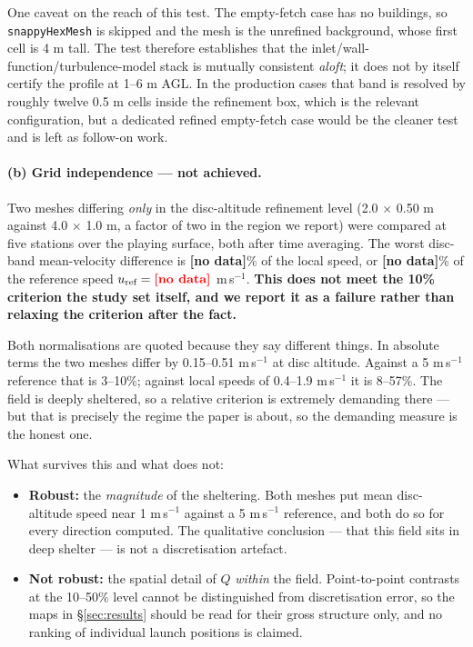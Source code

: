 \documentclass[11pt,letterpaper]{article}
\newcommand{\MISSINGNUM}{\textbf{\color{red}[no data]}}%
\newcommand{\GridDiff}{\MISSINGNUM}\newcommand{\GridDiffUref}{\MISSINGNUM}%
\begin{document}
One caveat on the reach of this test. The empty-fetch case has no buildings, so
\texttt{snappyHexMesh} is skipped and the mesh is the unrefined background,
whose first cell is 4 m tall. The test therefore establishes that the
inlet/wall-function/turbulence-model stack is mutually consistent \emph{aloft};
it does not by itself certify the profile at 1--6 m AGL. In the production cases
that band is resolved by roughly twelve 0.5 m cells inside the refinement box,
which is the relevant configuration, but a dedicated refined empty-fetch case
would be the cleaner test and is left as follow-on work.

\paragraph{(b) Grid independence --- \textbf{not achieved}.} Two meshes
differing \emph{only} in the disc-altitude refinement level (2.0 $\times$ 0.50 m
against 4.0 $\times$ 1.0 m, a factor of two in the region we report) were
compared at five stations over the playing surface, both after time averaging.
The worst disc-band mean-velocity difference is \GridDiff\% of the local
speed, or \GridDiffUref\% of the reference speed
$u_{\text{ref}} = \Uref$ m\,s$^{-1}$. \textbf{This does not meet the 10\%
criterion the study set itself, and we report it as a failure rather than
relaxing the criterion after the fact.}

Both normalisations are quoted because they say different things. In absolute
terms the two meshes differ by 0.15--0.51 m\,s$^{-1}$ at disc altitude. Against
a 5 m\,s$^{-1}$ reference that is 3--10\%; against local speeds of
0.4--1.9 m\,s$^{-1}$ it is 8--57\%. The field is deeply sheltered, so a
relative criterion is extremely demanding there --- but that is precisely the
regime the paper is about, so the demanding measure is the honest one.

What survives this and what does not:
\begin{itemize}[leftmargin=*,itemsep=2pt]
  \item \textbf{Robust:} the \emph{magnitude} of the sheltering. Both meshes
    put mean disc-altitude speed near 1 m\,s$^{-1}$ against a 5 m\,s$^{-1}$
    reference, and both do so for every direction computed. The qualitative
    conclusion --- that this field sits in deep shelter --- is not a
    discretisation artefact.
  \item \textbf{Not robust:} the spatial detail of $Q$ \emph{within} the
    field. Point-to-point contrasts at the 10--50\% level cannot be
    distinguished from discretisation error, so the maps in
    \S\ref{sec:results} should be read for their gross structure only, and
    no ranking of individual launch positions is claimed.
\end{itemize}
\end{document}
